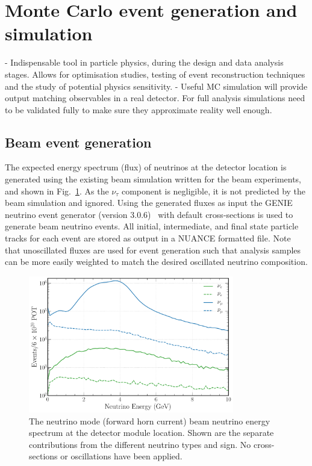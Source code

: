 \section{Monte Carlo event generation and simulation} %
\label{sec:chips_monte_carlo} %

- Indispensable tool in particle physics, during the design and data analysis stages. Allows for
optimisation studies, testing of event reconstruction techniques and the study of potential
physics sensitivity.
- Useful MC simulation will provide output matching observables in a real detector. For full
analysis simulations need to be validated fully to make sure they approximate reality well enough.

\subsection{Beam event generation} %
\label{sec:chips_monte_carlo_beam} %

The expected energy spectrum (flux) of neutrinos at the \chipsfive detector location is generated
using the existing beam simulation written for the \numi beam experiments, and shown in
Fig.~\ref{fig:flux}. As the $\nu_{\tau}$ component is negligible, it is not predicted by the beam
simulation and ignored. Using the generated fluxes as input the GENIE neutrino event generator
(version 3.0.6)~\cite{andreopoulos2009, andreopoulos2015} with default cross-sections is used to
generate beam neutrino events. All initial, intermediate, and final state particle tracks for each
event are stored as output in a NUANCE formatted file. Note that unoscillated fluxes are used for
event generation such that analysis samples can be more easily weighted to match the desired
oscillated neutrino composition.

\begin{figure} %
    \includegraphics[width=0.8\textwidth]{diagrams/4-chips/flux.pdf}
    \caption[\numi neutrino flux at CHIPS.]
    {The neutrino mode (forward horn current) \numi beam neutrino energy spectrum at the
        \chipsfive detector module location. Shown are the separate contributions from the
        different neutrino types and sign. No cross-sections or oscillations have been applied.}
    \label{fig:flux}
\end{figure}


